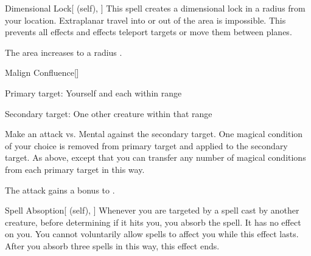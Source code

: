\lowercase{\hypertarget{spell:Dimensional Lock}{}}\label{spell:Dimensional Lock}
\begin{attuneability}[Rank 6]{\hypertarget{spell:Dimensional Lock}{Dimensional Lock}}[ (self), ]
\targetrule
This spell creates a dimensional lock in a \arealarge radius  from your location.
Extraplanar travel into or out of the area is impossible.
This prevents all  effects and effects teleport targets or move them between planes.

\rankline
{} The area increases to a \areahuge radius .
\end{attuneability}
\vspace{0.25em}



\lowercase{\hypertarget{spell:Malign Confluence}{}}\label{spell:Malign Confluence}
\begin{freeability}[Rank 6]{\hypertarget{spell:Malign Confluence}{Malign Confluence}}[]

Primary target: Yourself and each  within \rngmed range
\par\noindent
Secondary target: One other creature within that range

Make an attack vs. Mental against the secondary target.
\hit One magical condition of your choice is removed from primary target and applied to the secondary target.
\crit As above, except that you can transfer any number of magical conditions from each primary target in this way.

 The attack gains a  bonus to .
\end{freeability}
\vspace{0.25em}



\lowercase{\hypertarget{spell:Spell Absoption}{}}\label{spell:Spell Absoption}
\begin{attuneability}[Rank 7]{\hypertarget{spell:Spell Absoption}{Spell Absoption}}[ (self), ]
Whenever you are targeted by a spell cast by another creature, before determining if it hits you, you absorb the spell.
It has no effect on you.
You cannot voluntarily allow spells to affect you while this effect lasts.
After you absorb three spells in this way, this effect ends.
\end{attuneability}
\vspace{0.25em}



